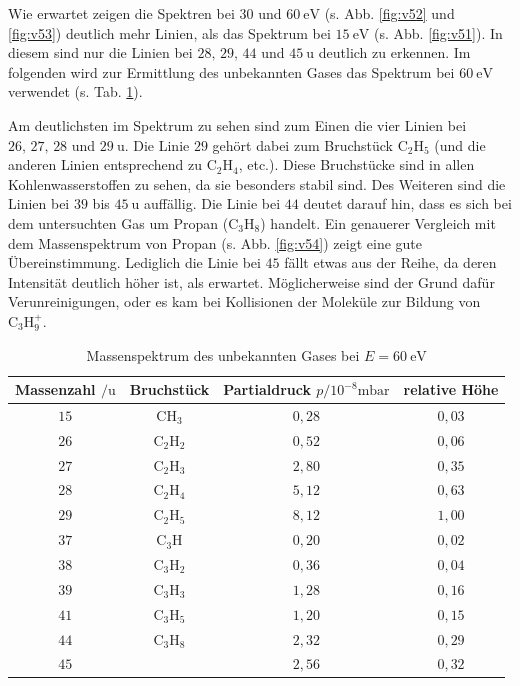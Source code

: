 Wie erwartet zeigen die Spektren bei $30$ und $\SI{60}{\electronvolt}$ (s. Abb. \ref{fig:v52} und \ref{fig:v53}) deutlich mehr Linien, als das Spektrum bei $\SI{15}{\electronvolt}$ (s. Abb. \ref{fig:v51}).
In diesem sind nur die Linien bei $28, \, 29, \, 44$ und $\SI{45}{\amu}$ deutlich zu erkennen. Im folgenden wird zur Ermittlung des unbekannten Gases das Spektrum bei $\SI{60}{\electronvolt}$ verwendet (s. Tab. \ref{tab:v5}).

Am deutlichsten im Spektrum zu sehen sind zum Einen die vier Linien bei $26, \, 27, \, 28$ und $\SI{29}{\amu}$. Die Linie $29$ gehört dabei zum Bruchstück $\textrm{C}_{2}\textrm{H}_{5}$ (und die anderen Linien entsprechend zu $\textrm{C}_{2}\textrm{H}_{4}$, etc.).
Diese Bruchstücke sind in allen Kohlenwasserstoffen zu sehen, da sie besonders stabil sind. Des Weiteren sind die Linien bei $39$ bis $\SI{45}{\amu}$ auffällig. Die Linie bei $44$ deutet darauf hin, dass es sich bei dem untersuchten Gas um Propan ($\textrm{C}_{3}\textrm{H}_{8}$) handelt.
Ein genauerer Vergleich mit dem Massenspektrum von Propan (s. Abb. \ref{fig:v54}) zeigt eine gute Übereinstimmung. Lediglich die Linie bei $45$ fällt etwas aus der Reihe, da deren Intensität deutlich höher ist, als erwartet.
Möglicherweise sind der Grund dafür Verunreinigungen, oder es kam bei Kollisionen der Moleküle zur Bildung von $\textrm{C}_{3}\textrm{H}_{9}^{+}$.

\begin{table}[tb]
 \centering
 \caption{Massenspektrum des unbekannten Gases bei $E=\SI{60}{\electronvolt}$}
 \label{tab:v5}
 \begin{tabular}{cccc} \toprule
   Massenzahl $/\si{\amu}$ & Bruchstück & Partialdruck $p/10^{-8}\si{\milli \bar}$ & relative Höhe \\ \midrule
   $15$ & CH$_{3}$ & $0,28$ & $0,03$\\
   $26$ & C$_{2}$H$_{2}$ & $0,52$ & $0,06$ \\
   $27$ & C$_{2}$H$_{3}$ & $2,80$ & $0,35$ \\
   $28$ & C$_{2}$H$_{4}$ & $5,12$ & $0,63$ \\
   $29$ & C$_{2}$H$_{5}$ & $8,12$ & $1,00$ \\
   $37$ & C$_{3}$H & $0,20$ & $0,02$ \\
   $38$ & C$_{3}$H$_{2}$ & $0,36$ & $0,04$ \\
   $39$ & C$_{3}$H$_{3}$ & $1,28$ & $0,16$ \\
   $41$ & C$_{3}$H$_{5}$ & $1,20$ & $0,15$ \\
   $44$ & C$_{3}$H$_{8}$ & $2,32$ & $0,29$ \\
   $45$ & & $2,56$ & $0,32$ \\ \bottomrule
 \end{tabular}
\end{table}


